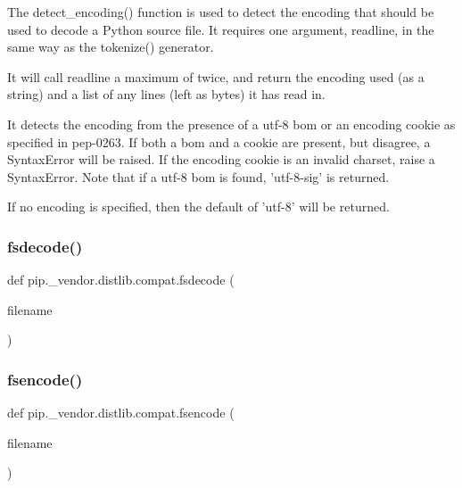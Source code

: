 \begin{DoxyVerb}The detect_encoding() function is used to detect the encoding that should
be used to decode a Python source file.  It requires one argument, readline,
in the same way as the tokenize() generator.

It will call readline a maximum of twice, and return the encoding used
(as a string) and a list of any lines (left as bytes) it has read in.

It detects the encoding from the presence of a utf-8 bom or an encoding
cookie as specified in pep-0263.  If both a bom and a cookie are present,
but disagree, a SyntaxError will be raised.  If the encoding cookie is an
invalid charset, raise a SyntaxError.  Note that if a utf-8 bom is found,
'utf-8-sig' is returned.

If no encoding is specified, then the default of 'utf-8' will be returned.
\end{DoxyVerb}
 \mbox{\label{namespacepip_1_1__vendor_1_1distlib_1_1compat_a8026e7add59e22fd94278d3b20c98c84}} 
\subsubsection{\texorpdfstring{fsdecode()}{fsdecode()}}
{\footnotesize\ttfamily def pip.\+\_\+vendor.\+distlib.\+compat.\+fsdecode (\begin{DoxyParamCaption}\item[{}]{filename }\end{DoxyParamCaption})}

\mbox{\label{namespacepip_1_1__vendor_1_1distlib_1_1compat_a1036cda476b9db50a58e1a40aafe71ff}} 
\subsubsection{\texorpdfstring{fsencode()}{fsencode()}}
{\footnotesize\ttfamily def pip.\+\_\+vendor.\+distlib.\+compat.\+fsencode (\begin{DoxyParamCaption}\item[{}]{filename }\end{DoxyParamCaption})}

